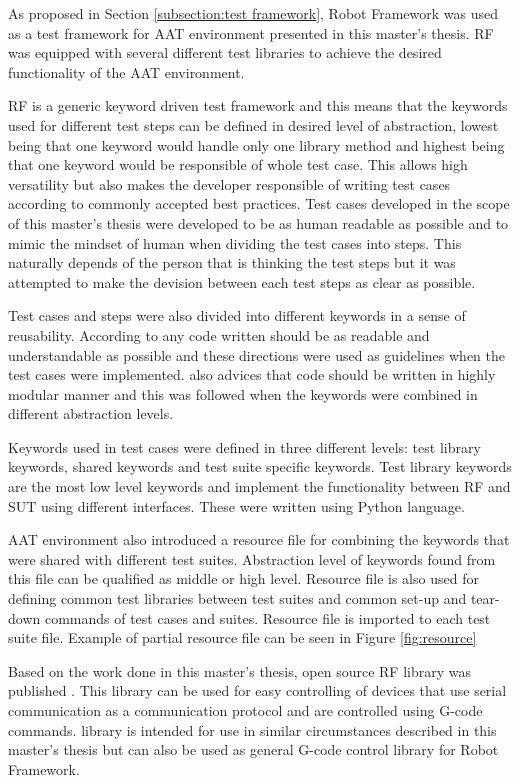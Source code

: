 As proposed in Section \ref{subsection:test framework}, Robot Framework was used as a test framework for AAT environment presented in this master's thesis. RF was equipped with several different test libraries to achieve the desired functionality of the AAT environment.

RF is a generic keyword driven test framework and this means that the keywords used for different test steps can be defined in desired level of abstraction, lowest being that one keyword would handle only one library method and highest being that one keyword would be responsible of whole test case. This allows high versatility but also makes the developer responsible of writing test cases according to commonly accepted best practices. Test cases developed in the scope of this master's thesis were developed to be as human readable as possible and to mimic the mindset of human when dividing the test cases into steps. This naturally depends of the person that is thinking the test steps but it was attempted to make the devision between each test steps as clear as possible.

Test cases and steps were also divided into different keywords in a sense of reusability. According to \emph{\cite{clean-code}} any code written should be as readable and understandable as possible and these directions were used as guidelines when the test cases were implemented. \emph{\cite{clean-code}} also advices that code should be written in highly modular manner and this was followed when the keywords were combined in different abstraction levels.

Keywords used in test cases were defined in three different levels: test library keywords, shared keywords and test suite specific keywords. Test library keywords are the most low level keywords and implement the functionality between RF and SUT using different interfaces. These were written using Python language. 

AAT environment also introduced a resource file for combining the keywords that were shared with different test suites. Abstraction level of keywords found from this file can be qualified as middle or high level. Resource file is also used for defining common test libraries between test suites and common set-up and tear-down commands of test cases and suites. Resource file is imported to each test suite file. Example of partial resource file can be seen in Figure \ref{fig:resource}

Based on the work done in this master's thesis, open source RF library was published \emph{\citep{cnc-library}}. This library can be used for easy controlling of devices that use serial communication as a communication protocol and are controlled using G-code commands. library is intended for use in similar circumstances described in this master's thesis but can also be used as general G-code control library for Robot Framework.

